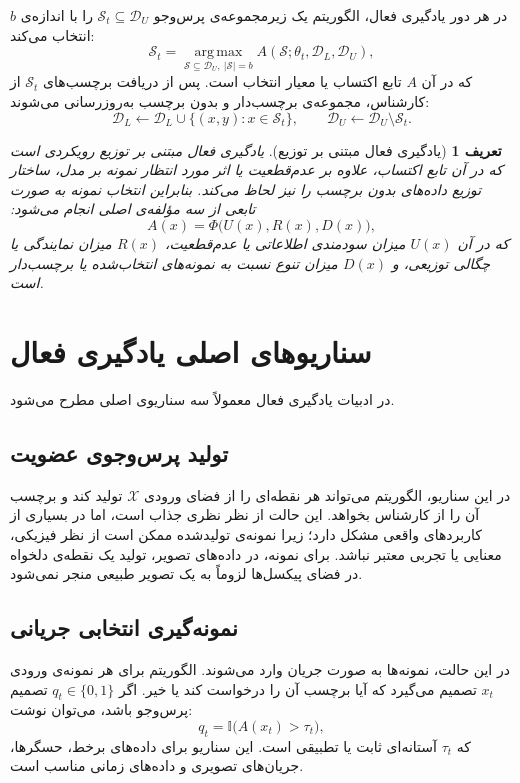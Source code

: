 \documentclass[12pt,a4paper,oneside]{report}
\newtheorem{definition}{تعریف}[chapter]
\newcommand{\cD}{\mathcal{D}}
\newcommand{\cX}{\mathcal{X}}
\newcommand{\cS}{\mathcal{S}}
\newcommand{\argmax}{\operatorname*{arg\,max}}
\begin{document}
در هر دور یادگیری فعال، الگوریتم یک زیرمجموعه‌ی پرس‌وجو $\cS_t\subseteq \cD_U$ را با اندازه‌ی $b$ انتخاب می‌کند:
\begin{equation}
\cS_t = \argmax_{\cS\subseteq \cD_U,\ |\cS|=b} A(\cS;\theta_t,\cD_L,\cD_U),
\end{equation}
که در آن $A$ تابع اکتساب یا معیار انتخاب است. پس از دریافت برچسب‌های $\cS_t$ از کارشناس، مجموعه‌ی برچسب‌دار و بدون برچسب به‌روزرسانی می‌شوند:
\begin{equation}
\cD_L \leftarrow \cD_L \cup \{(x,y):x\in \cS_t\},
\qquad
\cD_U \leftarrow \cD_U\setminus \cS_t.
\end{equation}

\begin{definition}[یادگیری فعال مبتنی بر توزیع]
یادگیری فعال مبتنی بر توزیع رویکردی است که در آن تابع اکتساب، علاوه بر عدم‌قطعیت یا اثر مورد انتظار نمونه بر مدل، ساختار توزیع داده‌های بدون برچسب را نیز لحاظ می‌کند. بنابراین انتخاب نمونه به صورت تابعی از سه مؤلفه‌ی اصلی انجام می‌شود:
\begin{equation}
A(x)=\Phi\big(U(x),R(x),D(x)\big),
\end{equation}
که در آن $U(x)$ میزان سودمندی اطلاعاتی یا عدم‌قطعیت، $R(x)$ میزان نمایندگی یا چگالی توزیعی، و $D(x)$ میزان تنوع نسبت به نمونه‌های انتخاب‌شده یا برچسب‌دار است.
\end{definition}

\section{سناریوهای اصلی یادگیری فعال}
\label{sec:dal_scenarios}

در ادبیات یادگیری فعال معمولاً سه سناریوی اصلی مطرح می‌شود.

\subsection{تولید پرس‌وجوی عضویت}
در این سناریو، الگوریتم می‌تواند هر نقطه‌ای را از فضای ورودی $\cX$ تولید کند و برچسب آن را از کارشناس بخواهد. این حالت از نظر نظری جذاب است، اما در بسیاری از کاربردهای واقعی مشکل دارد؛ زیرا نمونه‌ی تولیدشده ممکن است از نظر فیزیکی، معنایی یا تجربی معتبر نباشد. برای نمونه، در داده‌های تصویر، تولید یک نقطه‌ی دلخواه در فضای پیکسل‌ها لزوماً به یک تصویر طبیعی منجر نمی‌شود.

\subsection{نمونه‌گیری انتخابی جریانی}
در این حالت، نمونه‌ها به صورت جریان وارد می‌شوند. الگوریتم برای هر نمونه‌ی ورودی $x_t$ تصمیم می‌گیرد که آیا برچسب آن را درخواست کند یا خیر. اگر $q_t\in\{0,1\}$ تصمیم پرس‌وجو باشد، می‌توان نوشت:
\begin{equation}
q_t = \mathbb{I}\big(A(x_t)>\tau_t\big),
\end{equation}
که $\tau_t$ آستانه‌ای ثابت یا تطبیقی است. این سناریو برای داده‌های برخط، حسگرها، جریان‌های تصویری و داده‌های زمانی مناسب است.
\end{document}

